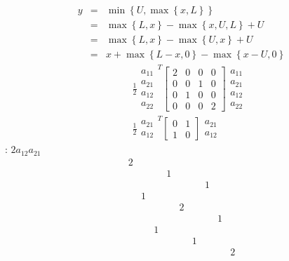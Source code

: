 \documentclass{article}
\begin{document}
\begin{eqnarray*}
y &=&\min \left\{ U,\max \left\{ x,L\right\} \right\}  \\
&=&\max \left\{ L,x\right\} -\max \left\{ x,U,L\right\} +U \\
&=&\max \left\{ L,x\right\} -\max \left\{ U,x\right\} +U \\
&=&x+\max \left\{ L-x,0\right\} -\max \left\{ x-U,0\right\} 
\end{eqnarray*}%
\begin{eqnarray*}
&&\frac{1}{2}%
\begin{array}{c}
a_{11} \\ 
a_{21} \\ 
a_{12} \\ 
a_{22}%
\end{array}%
^{T}\left[ 
\begin{array}{cccc}
2 & 0 & 0 & 0 \\ 
0 & 0 & 1 & 0 \\ 
0 & 1 & 0 & 0 \\ 
0 & 0 & 0 & 2%
\end{array}%
\right] 
\begin{array}{c}
a_{11} \\ 
a_{21} \\ 
a_{12} \\ 
a_{22}%
\end{array}
\\
&&\frac{1}{2}%
\begin{array}{c}
a_{21} \\ 
a_{12}%
\end{array}%
^{T}\left[ 
\begin{array}{cc}
0 & 1 \\ 
1 & 0%
\end{array}%
\right] 
\begin{array}{c}
a_{21} \\ 
a_{12}%
\end{array}%
\end{eqnarray*}%
: $2a_{12}a_{21}$ 
\[
\begin{array}{ccccccccc}
2 &  &  &  &  &  &  &  &  \\ 
&  &  & 1 &  &  &  &  &  \\ 
&  &  &  &  &  & 1 &  &  \\ 
& 1 &  &  &  &  &  &  &  \\ 
&  &  &  & 2 &  &  &  &  \\ 
&  &  &  &  &  &  & 1 &  \\ 
&  & 1 &  &  &  &  &  &  \\ 
&  &  &  &  & 1 &  &  &  \\ 
&  &  &  &  &  &  &  & 2%
\end{array}%
\]%
\end{document}
